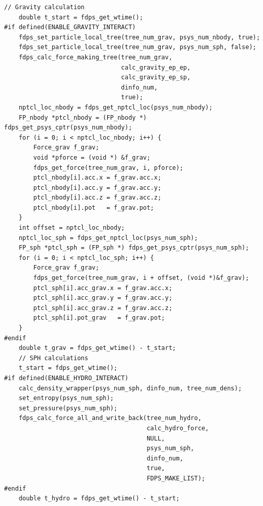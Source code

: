 \begin{lstlisting}[caption=Interaction calculations]
    // Gravity calculation
    double t_start = fdps_get_wtime();
#if defined(ENABLE_GRAVITY_INTERACT)
    fdps_set_particle_local_tree(tree_num_grav, psys_num_nbody, true);
    fdps_set_particle_local_tree(tree_num_grav, psys_num_sph, false);
    fdps_calc_force_making_tree(tree_num_grav,
                                calc_gravity_ep_ep,
                                calc_gravity_ep_sp,
                                dinfo_num,
                                true);
    nptcl_loc_nbody = fdps_get_nptcl_loc(psys_num_nbody);
    FP_nbody *ptcl_nbody = (FP_nbody *) fdps_get_psys_cptr(psys_num_nbody);
    for (i = 0; i < nptcl_loc_nbody; i++) {
        Force_grav f_grav;
        void *pforce = (void *) &f_grav;
        fdps_get_force(tree_num_grav, i, pforce);
        ptcl_nbody[i].acc.x = f_grav.acc.x;
        ptcl_nbody[i].acc.y = f_grav.acc.y;
        ptcl_nbody[i].acc.z = f_grav.acc.z;
        ptcl_nbody[i].pot   = f_grav.pot;
    }
    int offset = nptcl_loc_nbody;
    nptcl_loc_sph = fdps_get_nptcl_loc(psys_num_sph);
    FP_sph *ptcl_sph = (FP_sph *) fdps_get_psys_cptr(psys_num_sph);
    for (i = 0; i < nptcl_loc_sph; i++) {
        Force_grav f_grav;
        fdps_get_force(tree_num_grav, i + offset, (void *)&f_grav);
        ptcl_sph[i].acc_grav.x = f_grav.acc.x;
        ptcl_sph[i].acc_grav.y = f_grav.acc.y;
        ptcl_sph[i].acc_grav.z = f_grav.acc.z;
        ptcl_sph[i].pot_grav   = f_grav.pot;
    }
#endif
    double t_grav = fdps_get_wtime() - t_start;
    // SPH calculations
    t_start = fdps_get_wtime();
#if defined(ENABLE_HYDRO_INTERACT)
    calc_density_wrapper(psys_num_sph, dinfo_num, tree_num_dens);
    set_entropy(psys_num_sph);
    set_pressure(psys_num_sph);
    fdps_calc_force_all_and_write_back(tree_num_hydro,
                                       calc_hydro_force,
                                       NULL,
                                       psys_num_sph,
                                       dinfo_num,
                                       true,
                                       FDPS_MAKE_LIST);
#endif
    double t_hydro = fdps_get_wtime() - t_start;
\end{lstlisting}
\endifC


